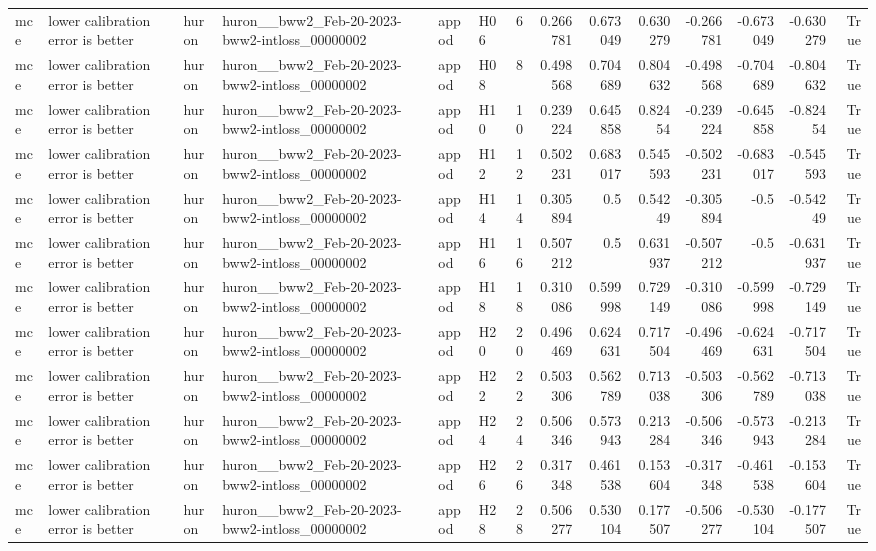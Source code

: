 \begin{longtable}{llllllrrrrrrrr}
mce & lower calibration error is better & huron & huron\_\_bww2\_Feb-20-2023-bww2-intloss\_00000002 & appod & H06 & 6 & 0.266781 & 0.673049 & 0.630279 & -0.266781 & -0.673049 & -0.630279 & True \\
mce & lower calibration error is better & huron & huron\_\_bww2\_Feb-20-2023-bww2-intloss\_00000002 & appod & H08 & 8 & 0.498568 & 0.704689 & 0.804632 & -0.498568 & -0.704689 & -0.804632 & True \\
mce & lower calibration error is better & huron & huron\_\_bww2\_Feb-20-2023-bww2-intloss\_00000002 & appod & H10 & 10 & 0.239224 & 0.645858 & 0.82454 & -0.239224 & -0.645858 & -0.82454 & True \\
mce & lower calibration error is better & huron & huron\_\_bww2\_Feb-20-2023-bww2-intloss\_00000002 & appod & H12 & 12 & 0.502231 & 0.683017 & 0.545593 & -0.502231 & -0.683017 & -0.545593 & True \\
mce & lower calibration error is better & huron & huron\_\_bww2\_Feb-20-2023-bww2-intloss\_00000002 & appod & H14 & 14 & 0.305894 & 0.5 & 0.54249 & -0.305894 & -0.5 & -0.54249 & True \\
mce & lower calibration error is better & huron & huron\_\_bww2\_Feb-20-2023-bww2-intloss\_00000002 & appod & H16 & 16 & 0.507212 & 0.5 & 0.631937 & -0.507212 & -0.5 & -0.631937 & True \\
mce & lower calibration error is better & huron & huron\_\_bww2\_Feb-20-2023-bww2-intloss\_00000002 & appod & H18 & 18 & 0.310086 & 0.599998 & 0.729149 & -0.310086 & -0.599998 & -0.729149 & True \\
mce & lower calibration error is better & huron & huron\_\_bww2\_Feb-20-2023-bww2-intloss\_00000002 & appod & H20 & 20 & 0.496469 & 0.624631 & 0.717504 & -0.496469 & -0.624631 & -0.717504 & True \\
mce & lower calibration error is better & huron & huron\_\_bww2\_Feb-20-2023-bww2-intloss\_00000002 & appod & H22 & 22 & 0.503306 & 0.562789 & 0.713038 & -0.503306 & -0.562789 & -0.713038 & True \\
mce & lower calibration error is better & huron & huron\_\_bww2\_Feb-20-2023-bww2-intloss\_00000002 & appod & H24 & 24 & 0.506346 & 0.573943 & 0.213284 & -0.506346 & -0.573943 & -0.213284 & True \\
mce & lower calibration error is better & huron & huron\_\_bww2\_Feb-20-2023-bww2-intloss\_00000002 & appod & H26 & 26 & 0.317348 & 0.461538 & 0.153604 & -0.317348 & -0.461538 & -0.153604 & True \\
mce & lower calibration error is better & huron & huron\_\_bww2\_Feb-20-2023-bww2-intloss\_00000002 & appod & H28 & 28 & 0.506277 & 0.530104 & 0.177507 & -0.506277 & -0.530104 & -0.177507 & True \\

\end{longtable}
